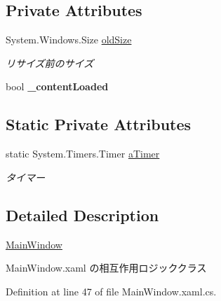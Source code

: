 \subsection*{Private Attributes}
\begin{DoxyCompactItemize}
\item 
System.\+Windows.\+Size \hyperlink{class_reversi4color_wpf_1_1_main_window_a1857642b52ef8d10a778fe1beccab002}{old\+Size}\hypertarget{class_reversi4color_wpf_1_1_main_window_a1857642b52ef8d10a778fe1beccab002}{}\label{class_reversi4color_wpf_1_1_main_window_a1857642b52ef8d10a778fe1beccab002}

\begin{DoxyCompactList}\small\item\em リサイズ前のサイズ \end{DoxyCompactList}\item 
bool {\bfseries \+\_\+content\+Loaded}\hypertarget{class_reversi4color_wpf_1_1_main_window_a03146ff24268f3a190fb5f8cea708ac0}{}\label{class_reversi4color_wpf_1_1_main_window_a03146ff24268f3a190fb5f8cea708ac0}

\end{DoxyCompactItemize}
\subsection*{Static Private Attributes}
\begin{DoxyCompactItemize}
\item 
static System.\+Timers.\+Timer \hyperlink{class_reversi4color_wpf_1_1_main_window_af59cb1c3ab5bad6256e2e3eeadba0c35}{a\+Timer}\hypertarget{class_reversi4color_wpf_1_1_main_window_af59cb1c3ab5bad6256e2e3eeadba0c35}{}\label{class_reversi4color_wpf_1_1_main_window_af59cb1c3ab5bad6256e2e3eeadba0c35}

\begin{DoxyCompactList}\small\item\em タイマー \end{DoxyCompactList}\end{DoxyCompactItemize}


\subsection{Detailed Description}
\hyperlink{class_reversi4color_wpf_1_1_main_window}{Main\+Window} 

Main\+Window.\+xaml の相互作用ロジッククラス

Definition at line 47 of file Main\+Window.\+xaml.\+cs.



